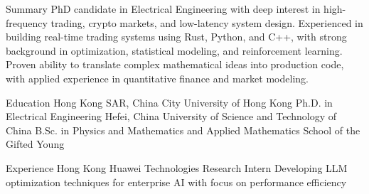 \documentclass[caps, english]{financecv}
\begin{document}
\begin{cvsection}{Summary}
    PhD candidate in Electrical Engineering with deep interest in high-frequency trading, crypto markets, and low-latency system design. Experienced in building real-time trading systems using Rust, Python, and C++, with strong background in optimization, statistical modeling, and reinforcement learning. Proven ability to translate complex mathematical ideas into production code, with applied experience in quantitative finance and market modeling.
\end{cvsection}

\begin{cvsection}{Education}
    {Hong Kong SAR, China}
    {City University of Hong Kong}
    {}
    {Ph.D. in Electrical Engineering}
    {}
    {}
    {}
    {Hefei, China}
    {University of Science and Technology of China}
    {}
    {B.Sc. in Physics and Mathematics and Applied Mathematics}
    {School of the Gifted Young}
    {}
    {}
\end{cvsection}

\begin{cvsection}{Experience}
    {Hong Kong}
    {Huawei Technologies}
    {Research Intern}
    {Developing LLM optimization techniques for enterprise AI with focus on performance efficiency}
    {}
    {}
    {}
\end{cvsection}
\end{document}
